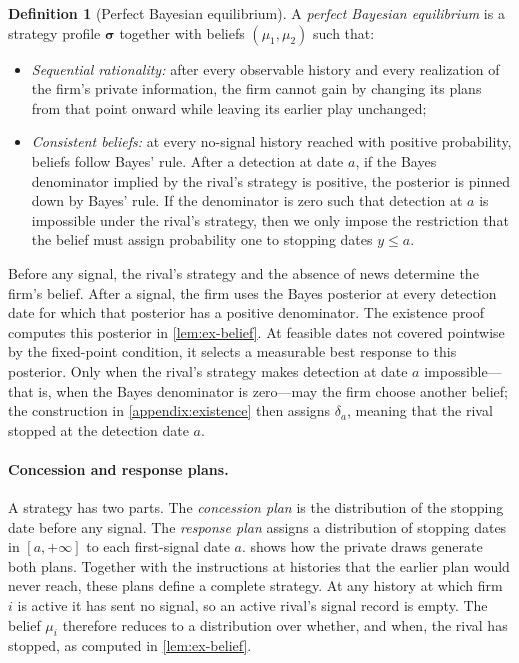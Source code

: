 \documentclass[12pt,reqno]{article}
\theoremstyle{definition} \newtheorem{example}{Example}
\theoremstyle{definition} \newtheorem{condition}{Condition}
\theoremstyle{definition} \newtheorem{corollary}{Corollary}
\theoremstyle{definition} \newtheorem{claim}{Claim}
\theoremstyle{definition} \newtheorem{definition}{Definition}
\theoremstyle{definition} \newtheorem{conjecture}{Conjecture}
\theoremstyle{definition} \newtheorem{Lemma}{Lemma}
\theoremstyle{definition} \newtheorem{lemma}{Lemma}
\theoremstyle{plain} \newtheorem{theorem}{Theorem}
\theoremstyle{definition} \newtheorem{assumption}{Assumption}
\theoremstyle{definition} \newtheorem*{assumptionnonumber}{Assumption}
\theoremstyle{definition} \newtheorem*{theoremNoNumber}{Proposition}
\theoremstyle{definition}
\theoremstyle{definition}\newtheorem{proposition}{Proposition}
\theoremstyle{definition} \newtheorem{result}{Result}
\theoremstyle{definition} \newtheorem*{definitionNoNumber}{Definition}
\theoremstyle{definition} \newtheorem{Definition}{Definition}
\theoremstyle{definition} \newtheorem*{DefinitionNoNumber}{Definition}
\theoremstyle{definition} \newtheorem*{fact}{Fact}
\theoremstyle{definition} \newtheorem*{property}{Property}
\theoremstyle{definition} \newtheorem{remark}{Remark}
\begin{document}
\begin{definition}[Perfect Bayesian equilibrium]\label{def:pbe}
A \emph{perfect Bayesian equilibrium} is a strategy profile $\bm\sigma$ together with beliefs $(\mu_1,\mu_2)$ such that:
\begin{itemize}
\item[(i)] \emph{Sequential rationality:} after every observable history and every realization of the firm's private information, the firm cannot gain by changing its plans from that point onward while leaving its earlier play unchanged;
\item[(ii)] \emph{Consistent beliefs:} at every no-signal history reached with positive probability, beliefs follow Bayes' rule. After a detection at date $a$, if the Bayes denominator implied by the rival's strategy is positive, the posterior is pinned down by Bayes' rule. If the denominator is zero such that detection at $a$ is impossible under the rival's strategy, then we only impose the restriction that the belief must assign probability one to stopping dates $y\le a$. %
\end{itemize}\end{definition} 

Before any signal, the rival's strategy and the absence of news determine the firm's belief. After a signal, the firm uses the Bayes posterior at every detection date for which that posterior has a positive denominator. The existence proof computes this posterior in \cref{lem:ex-belief}. At feasible dates not covered pointwise by the fixed-point condition, it selects a measurable best response to this posterior. Only when the rival’s strategy makes detection at date $a$ impossible—that is, when the Bayes denominator is zero—may the firm choose another belief; the construction in \cref{appendix:existence} then assigns $\delta_a$, meaning that the rival stopped at the detection date $a$.

\paragraph{Concession and response plans.}
A strategy has two parts. The \emph{concession plan} is the distribution of the stopping date before any signal. The \emph{response plan} assigns a distribution of stopping dates in $[a,+\infty]$ to each first-signal date $a$.  shows how the private draws generate both plans. Together with the instructions at histories that the earlier plan would never reach, these plans define a complete strategy. At any history at which firm $i$ is active it has sent no signal, so an active rival's signal record is empty. The belief $\mu_i$ therefore reduces to a distribution over whether, and when, the rival has stopped, as computed in \cref{lem:ex-belief}.
\end{document}
